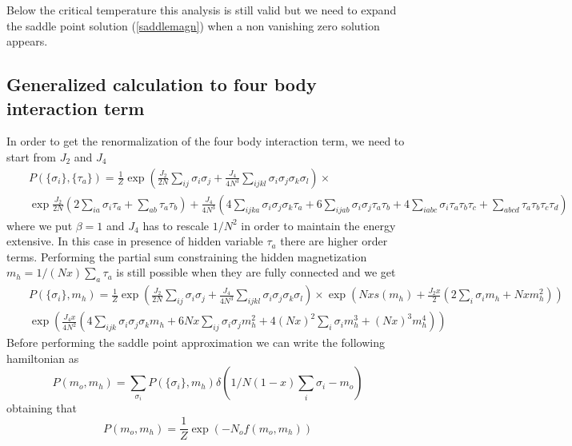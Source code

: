 \documentclass[aps,pre,noshowpacs]{revtex4}
\begin{document}
Below the critical temperature this analysis is still valid but we need to expand the saddle point solution (\ref{saddlemagn}) when a non vanishing zero solution appears. 

\subsection{Generalized calculation to four body interaction term}

In order to get the renormalization of the four body interaction term, we need to start from $J_2$ and $J_4$
\begin{eqnarray}
&&P(\{\sigma_i\},\{\tau_a\})=\frac{1}{Z} \exp\left( \frac{J_2}{2 N} \sum_{i  j} \sigma_i \sigma_j +\frac{J_4}{ 4N^3}\sum_{i j k l}  \sigma_i\sigma_j\sigma_k \sigma_l \right)\times\nonumber\\ &&\exp  \frac{J_2}{2 N} \left(2 \sum_{ia} \sigma_i \tau_a + \sum_{a b}\tau_a \tau_b \right)+ 
\frac{J_4}{4N^3 } \left( 4 \sum_{i j k a}  \sigma_i\sigma_j\sigma_k \tau_a + 6 \sum_{ijab} \sigma_i \sigma_j \tau_a\tau_b
+ 4 \sum_{iabc} \sigma_i \tau_a\tau_b\tau_c + \sum_{abcd} \tau_a\tau_b\tau_c\tau_d \right)
\end{eqnarray}
where we put $\beta=1$ and $J_4$ has to rescale $1/N^2$ in order to maintain the energy extensive.
In this case in presence of hidden variable $\tau_a$ there are higher order terms. Performing the 
partial sum constraining the hidden magnetization $m_h=1/(N x) \sum_a\tau_a$  is still possible when they are
fully connected and we get
\begin{eqnarray}
&&P(\{\sigma_i\},m_h)= \frac{1}{Z} \exp\left(\frac{ J_2}{2N}  \sum_{ij} \sigma_i \sigma_j + \frac{ J_4 }{4 N^3 } \sum_{ijkl} \sigma_i \sigma_j\sigma_k \sigma_l \right)\times \exp\left (Nx s(m_h)+ \frac{J_2 x }{2} \left( 2 \sum_i\sigma_i m_h + Nx m_h^2 \right)\right) \nonumber\\ && \exp\left(\frac{J_4 x}{4 N^2} \left( 4 \sum_{ijk} \sigma_i\sigma_j\sigma_k m_h + 6 N x \sum_{ij} \sigma_i \sigma_j m_h^2 + 4 (Nx)^2 \sum_i \sigma_i m_h^3 + (Nx)^3 m_h^4 \right)\right)
\end{eqnarray}
Before performing the saddle point approximation we can write the following hamiltonian as
\begin{equation}
P(m_o,m_h)=\sum_{\sigma_i} P(\{\sigma_i\},m_h) \delta(1/N(1-x) \sum_i \sigma_i-m_o)
\end{equation}
obtaining that
\begin{equation}
P(m_o,m_h)= \frac{1}{Z} \exp(-N_o f(m_o,m_h))
\end{equation}
\end{document}
